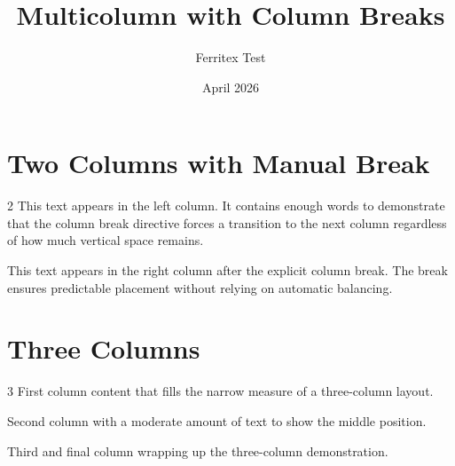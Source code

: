 \documentclass{article}
\title{Multicolumn with Column Breaks}
\author{Ferritex Test}
\date{April 2026}
\begin{document}
\maketitle

\section{Two Columns with Manual Break}

\begin{multicols}{2}
This text appears in the left column. It contains enough words to
demonstrate that the column break directive forces a transition to the
next column regardless of how much vertical space remains.

\columnbreak

This text appears in the right column after the explicit column break.
The break ensures predictable placement without relying on automatic
balancing.
\end{multicols}

\section{Three Columns}

\begin{multicols}{3}
First column content that fills the narrow measure of a three-column
layout.

\columnbreak

Second column with a moderate amount of text to show the middle
position.

\columnbreak

Third and final column wrapping up the three-column demonstration.
\end{multicols}
\end{document}
